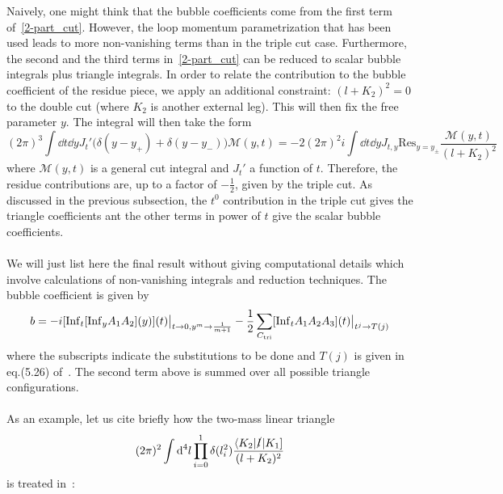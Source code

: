 Naively, one might think that the bubble coefficients come from the first term of~\cref{2-part_cut}.
However, the loop momentum parametrization that has been used leads to more non-vanishing terms than in the triple cut case. 
Furthermore, the second and the third terms in~\cref{2-part_cut} can be reduced to scalar bubble integrals plus triangle integrals. 
In order to relate the contribution to the bubble coefficient of the residue piece, we apply an additional constraint: $(l+K_2)^2=0$ to the double cut (where $K_2$ is another external leg).
This will then fix the free parameter $y$.
The integral will then take the form
\begin{equation}
(2\pi)^3\int \dd t \dd y J_t'\big(\delta(y-y_+) + \delta(y-y_-)\big) \mathcal{M}(y,t) = -2(2\pi)^2 i \int \dd t \dd y J_{t,y}\mathrm{Res}_{y = y_{\pm}}\frac{\mathcal{M}(y,t)}{(l+K_2)^2}
\end{equation}
where $\mathcal{M}(y,t)$ is a general cut integral and $J_t'$ a function of $t$.
Therefore, the residue contributions are, up to a factor of $-\frac{1}{2}$, given by the triple cut.
As discussed in the previous subsection, the $t^0$ contribution in the triple cut gives the triangle coefficients ant the other terms in power of $t$ give the scalar bubble coefficients.
\\\\
We will just list here the final result without giving computational details which involve calculations of non-vanishing integrals and reduction techniques.
The bubble coefficient is given by
\begin{equation}
b = -i[\mathrm{Inf}_t[\mathrm{Inf}_y A_1 A_2](y)](t)\big|_{t\rightarrow 0 , y^m\rightarrow \frac{1}{m+1}}
-\frac{1}{2}\sum_{C_{\mathrm{tri}}}[\mathrm{Inf}_t A_1A_2A_3](t)\big|_{t^j\rightarrow T(j)}
\end{equation}
where the subscripts indicate the substitutions to be done and $T(j)$ is given in eq.(5.26) of~\cite{Forde:2007mi}. 
The second term above is summed over all possible triangle configurations.
\\\\
\iffalse
As an example, let us cite briefly how the two-mass linear triangle
\begin{equation}
(2\pi)^2\int\textrm{d}^4 l \prod_{i=0}^1\delta(l_i^2)\frac{\langle K_2|\slashed{l}|K_1]}{(l+K_2)^2}
\end{equation}
is treated in~\cite{Forde:2007mi}:
